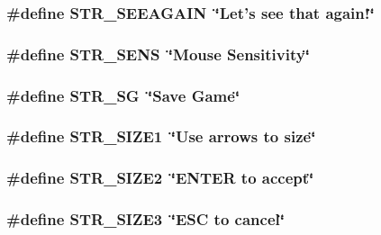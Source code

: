 \hypertarget{FOREIGN_8H_a61cca78cefc5a4f20dc000ed288a19e0}{
\subsubsection[{STR\_\-SEEAGAIN}]{\setlength{\rightskip}{0pt plus 5cm}\#define STR\_\-SEEAGAIN~\char`\"{}Let's see that again!\char`\"{}}}
\label{FOREIGN_8H_a61cca78cefc5a4f20dc000ed288a19e0}
\hypertarget{FOREIGN_8H_a571a8f88c4f7f91f33faa7717eb2353b}{
\subsubsection[{STR\_\-SENS}]{\setlength{\rightskip}{0pt plus 5cm}\#define STR\_\-SENS~\char`\"{}Mouse Sensitivity\char`\"{}}}
\label{FOREIGN_8H_a571a8f88c4f7f91f33faa7717eb2353b}
\hypertarget{FOREIGN_8H_ab77c7cf50374248e3e2dee0e6d9a3648}{
\subsubsection[{STR\_\-SG}]{\setlength{\rightskip}{0pt plus 5cm}\#define STR\_\-SG~\char`\"{}Save Game\char`\"{}}}
\label{FOREIGN_8H_ab77c7cf50374248e3e2dee0e6d9a3648}
\hypertarget{FOREIGN_8H_ab0a9a48885ea7cb84b28d604bf5f28ec}{
\subsubsection[{STR\_\-SIZE1}]{\setlength{\rightskip}{0pt plus 5cm}\#define STR\_\-SIZE1~\char`\"{}Use arrows to size\char`\"{}}}
\label{FOREIGN_8H_ab0a9a48885ea7cb84b28d604bf5f28ec}
\hypertarget{FOREIGN_8H_a57660fc2dc819165c7c3b9678dd527f6}{
\subsubsection[{STR\_\-SIZE2}]{\setlength{\rightskip}{0pt plus 5cm}\#define STR\_\-SIZE2~\char`\"{}ENTER to accept\char`\"{}}}
\label{FOREIGN_8H_a57660fc2dc819165c7c3b9678dd527f6}
\hypertarget{FOREIGN_8H_a86506394aab90889faeb2c8f08f80039}{
\subsubsection[{STR\_\-SIZE3}]{\setlength{\rightskip}{0pt plus 5cm}\#define STR\_\-SIZE3~\char`\"{}ESC to cancel\char`\"{}}}

